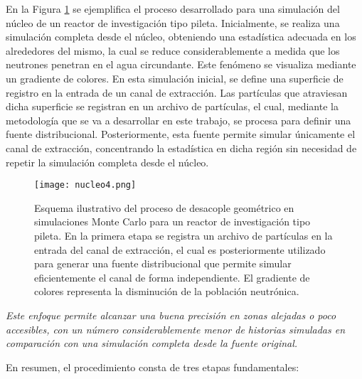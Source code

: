 En la Figura \ref{fig:nucleo4} se ejemplifica el proceso desarrollado para una simulación del núcleo de un reactor de investigación tipo pileta. Inicialmente, se realiza una simulación completa desde el núcleo, obteniendo una estadística adecuada en los alrededores del mismo, la cual se reduce considerablemente a medida que los neutrones penetran en el agua circundante. Este fenómeno se visualiza mediante un gradiente de colores. En esta simulación inicial, se define una superficie de registro en la entrada de un canal de extracción. Las partículas que atraviesan dicha superficie se registran en un archivo de partículas, el cual, mediante la metodología que se va a desarrollar en este trabajo, se procesa para definir una fuente distribucional. Posteriormente, esta fuente permite simular únicamente el canal de extracción, concentrando la estadística en dicha región sin necesidad de repetir la simulación completa desde el núcleo.

\begin{figure}[H]
    \centering
    \texttt{[image: nucleo4.png]}
    \caption{Esquema ilustrativo del proceso de desacople geométrico en simulaciones Monte Carlo para un reactor de investigación tipo pileta. En la primera etapa se registra un archivo de partículas en la entrada del canal de extracción, el cual es posteriormente utilizado para generar una fuente distribucional que permite simular eficientemente el canal de forma independiente. El gradiente de colores representa la disminución de la población neutrónica.}
    \label{fig:nucleo4}
\end{figure}

\emph{Este enfoque permite alcanzar una buena precisión en zonas alejadas o poco accesibles, con un número considerablemente menor de historias simuladas en comparación con una simulación completa desde la fuente original.}

En resumen, el procedimiento consta de tres etapas fundamentales:

